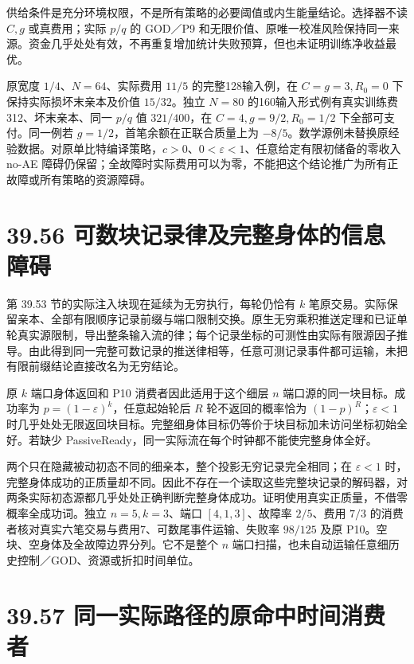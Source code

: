 \documentclass[
  11pt,
  oneside]{book}
\begin{document}
供给条件是充分环境权限，不是所有策略的必要阈值或内生能量结论。选择器不读 \(C,g\) 或真费用；实际 \(p/q\) 的 GOD／P9 和无限价值、原唯一校准风险保持同一来源。资金几乎处处有效，不再重复增加统计失败预算，但也未证明训练净收益最优。

原宽度 \(1/4\)、\(N=64\)、实际费用 \(11/5\) 的完整128输入例，在 \(C=g=3,R_0=0\) 下保持实际损坏末亲本及价值 \(15/32\)。独立 \(N=80\) 的160输入形式例有真实训练费312、坏末亲本、同一 \(p/q\) 值 \(321/400\)，在 \(C=4,g=9/2,R_0=1/2\) 下全部可支付。同一例若 \(g=1/2\)，首笔余额在正联合质量上为 \(-8/5\)。数学源例未替换原经验数据。对原单比特编译策略，\(c>0\)、\(0<\varepsilon<1\)、任意给定有限初储备的零收入 no-AE 障碍仍保留；全故障时实际费用可以为零，不能把这个结论推广为所有正故障或所有策略的资源障碍。

\section{39.56 可数块记录律及完整身体的信息障碍}\label{ux53efux6570ux5757ux8bb0ux5f55ux5f8bux53caux5b8cux6574ux8eabux4f53ux7684ux4fe1ux606fux969cux788d}

第 39.53 节的实际注入块现在延续为无穷执行，每轮仍恰有 \(k\) 笔原交易。实际保留亲本、全部有限顺序记录前缀与端口限制交换。原生无穷乘积推送定理和已证单轮真实源限制，导出整条输入流的律；每个记录坐标的可测性由实际有限源因子推导。由此得到同一完整可数记录的推送律相等，任意可测记录事件都可运输，未把有限前缀结论直接改名为无穷结论。

原 \(k\) 端口身体返回和 P10 消费者因此适用于这个细层 \(n\) 端口源的同一块目标。成功率为 \(p=(1-\varepsilon)^k\)，任意起始轮后 \(R\) 轮不返回的概率恰为 \((1-p)^R\)；\(\varepsilon<1\) 时几乎处处无限返回块目标。完整细身体目标仍等价于块目标加未访问坐标初始全好。若缺少 PassiveReady，同一实际流在每个时钟都不能使完整身体全好。

两个只在隐藏被动初态不同的细亲本，整个投影无穷记录完全相同；在 \(\varepsilon<1\) 时，完整身体成功的正质量却不同。因此不存在一个读取这些完整块记录的解码器，对两条实际初态源都几乎处处正确判断完整身体成功。证明使用真实正质量，不借零概率全成功词。独立 \(n=5,k=3\)、端口 \([4,1,3]\)、故障率 \(2/5\)、费用 \(7/3\) 的消费者核对真实六笔交易与费用7、可数尾事件运输、失败率 \(98/125\) 及原 P10。空块、空身体及全故障边界分列。它不是整个 \(n\) 端口扫描，也未自动运输任意细历史控制／GOD、资源或折扣时间单位。

\section{39.57 同一实际路径的原命中时间消费者}\label{ux540cux4e00ux5b9eux9645ux8defux5f84ux7684ux539fux547dux4e2dux65f6ux95f4ux6d88ux8d39ux8005}
\end{document}
